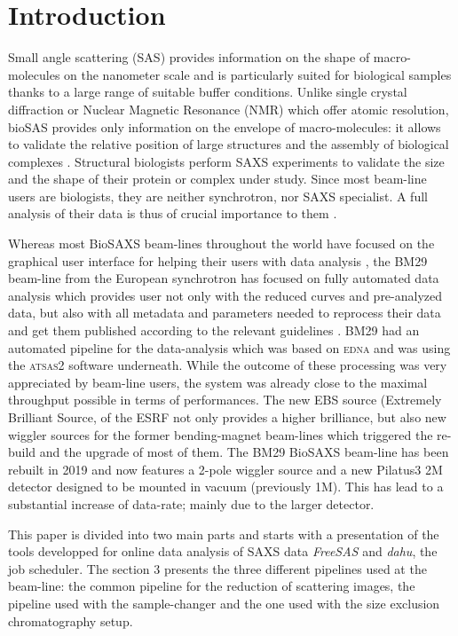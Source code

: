 \documentclass[preprint]{iucr}              %
\begin{document}
\section{Introduction}
Small angle scattering (SAS) provides information on the shape of macro-molecules on the nanometer scale and is particularly suited for biological samples thanks to a large range of suitable buffer conditions.
Unlike single crystal diffraction or Nuclear Magnetic Resonance (NMR) which offer atomic resolution, bioSAS provides only information on the envelope of macro-molecules: it allows to validate the relative position of large structures and the assembly of biological complexes \cite{biosaxs_rev2018}. 
Structural biologists perform SAXS experiments to validate the size and the shape of their protein or complex under study. 
Since most beam-line users are biologists, they are neither synchrotron, nor SAXS specialist.
A full analysis of their data is thus of crucial importance to them \cite{shibom}. 


Whereas most BioSAXS beam-lines throughout the world have focused on the graphical user interface for helping their users with data analysis \cite{dawn, als-biosaxs}, the BM29 beam-line from the European synchrotron \cite{BM29paper} has focused on fully automated data analysis which provides user not only with the reduced curves and pre-analyzed data, but also with all metadata and parameters needed to reprocess their data and get them published according to the relevant guidelines \cite{guidelines_2017}.
BM29 had an automated pipeline for the data-analysis which was based on \textsc{edna} \cite{edna} and was using the \textsc{atsas2} \cite{ATSAS2} software underneath. 
While the outcome of these processing was very appreciated by beam-line users, the system was already close to the maximal throughput possible in terms of performances. 
The new EBS source (Extremely Brilliant Source,  of the ESRF not only provides a higher brilliance, but also new wiggler sources for the former bending-magnet beam-lines which triggered the re-build and the upgrade of most of them. 
The BM29 BioSAXS beam-line has been rebuilt in 2019 and now features a 2-pole wiggler source and a new Pilatus3 2M detector designed to be mounted in vacuum (previously 1M). 
This has lead to a substantial increase of data-rate; mainly due to the larger detector. 

This paper is divided into two main parts and starts with a presentation of the tools developped for online data analysis of SAXS data \textit{FreeSAS} and \textit{dahu}, the job scheduler.
The section 3 presents the three different pipelines used at the beam-line: the common pipeline for the reduction of scattering images, the pipeline used with the sample-changer and the one used with the size exclusion chromatography setup.
\end{document}
